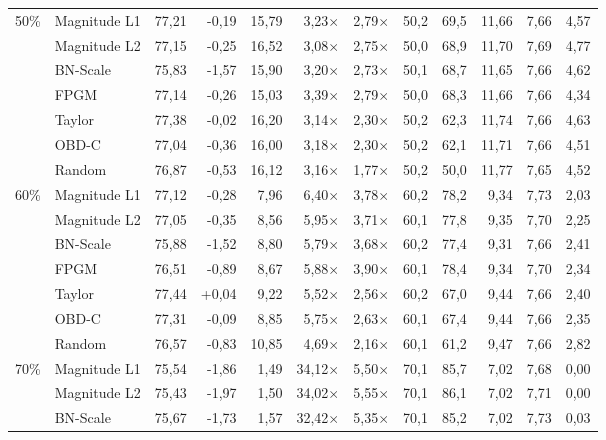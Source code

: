 \begin{table}[H]
{{\begin{tabular}{c l rr rrr rr rrr}
    \multirow{7}{*}{50\%} & Magnitude L1 & 77,21 & -0,19 & 15,79 & 3,23$\times$ & 2,79$\times$ & 50,2 & 69,5 & 11,66 & 7,66 & 4,57 \\
     & Magnitude L2 & 77,15 & -0,25 & 16,52 & 3,08$\times$ & 2,75$\times$ & 50,0 & 68,9 & 11,70 & 7,69 & 4,77 \\
     & BN-Scale & 75,83 & -1,57 & 15,90 & 3,20$\times$ & 2,73$\times$ & 50,1 & 68,7 & 11,65 & 7,66 & 4,62 \\
     & FPGM & 77,14 & -0,26 & 15,03 & 3,39$\times$ & 2,79$\times$ & 50,0 & 68,3 & 11,66 & 7,66 & 4,34 \\
     & Taylor & 77,38 & -0,02 & 16,20 & 3,14$\times$ & 2,30$\times$ & 50,2 & 62,3 & 11,74 & 7,66 & 4,63 \\
     & OBD-C & 77,04 & -0,36 & 16,00 & 3,18$\times$ & 2,30$\times$ & 50,2 & 62,1 & 11,71 & 7,66 & 4,51 \\
     & Random & 76,87 & -0,53 & 16,12 & 3,16$\times$ & 1,77$\times$ & 50,2 & 50,0 & 11,77 & 7,65 & 4,52 \\
    \midrule
    \multirow{7}{*}{60\%} & Magnitude L1 & 77,12 & -0,28 & 7,96 & 6,40$\times$ & 3,78$\times$ & 60,2 & 78,2 & 9,34 & 7,73 & 2,03 \\
     & Magnitude L2 & 77,05 & -0,35 & 8,56 & 5,95$\times$ & 3,71$\times$ & 60,1 & 77,8 & 9,35 & 7,70 & 2,25 \\
     & BN-Scale & 75,88 & -1,52 & 8,80 & 5,79$\times$ & 3,68$\times$ & 60,2 & 77,4 & 9,31 & 7,66 & 2,41 \\
     & FPGM & 76,51 & -0,89 & 8,67 & 5,88$\times$ & 3,90$\times$ & 60,1 & 78,4 & 9,34 & 7,70 & 2,34 \\
     & Taylor & 77,44 & +0,04 & 9,22 & 5,52$\times$ & 2,56$\times$ & 60,2 & 67,0 & 9,44 & 7,66 & 2,40 \\
     & OBD-C & 77,31 & -0,09 & 8,85 & 5,75$\times$ & 2,63$\times$ & 60,1 & 67,4 & 9,44 & 7,66 & 2,35 \\
     & Random & 76,57 & -0,83 & 10,85 & 4,69$\times$ & 2,16$\times$ & 60,1 & 61,2 & 9,47 & 7,66 & 2,82 \\
    \midrule
    \multirow{7}{*}{70\%} & Magnitude L1 & 75,54 & -1,86 & 1,49 & 34,12$\times$ & 5,50$\times$ & 70,1 & 85,7 & 7,02 & 7,68 & 0,00 \\
     & Magnitude L2 & 75,43 & -1,97 & 1,50 & 34,02$\times$ & 5,55$\times$ & 70,1 & 86,1 & 7,02 & 7,71 & 0,00 \\
     & BN-Scale & 75,67 & -1,73 & 1,57 & 32,42$\times$ & 5,35$\times$ & 70,1 & 85,2 & 7,02 & 7,73 & 0,03 \\

\end{tabular}}}
\end{table}
